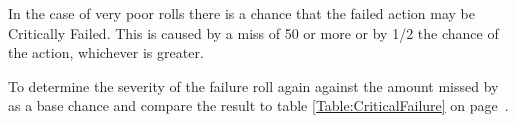 In the case of very poor rolls there is a chance that the failed action 
may be Critically Failed. This is caused by a miss of 50 or more or by 
1/2 the chance of the action, whichever is greater.

To determine the severity of the failure roll again against the 
amount missed by as a base chance and compare the result to table 
\ref{Table:CriticalFailure} on page~\pageref{Table:CriticalFailure}.



